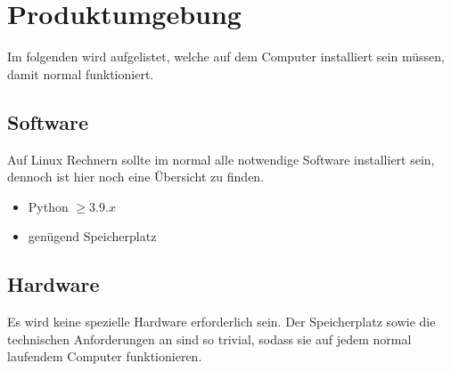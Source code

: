 \chapter{Produktumgebung}
Im folgenden wird aufgelistet, welche  auf dem Computer installiert sein müssen, damit \e normal funktioniert.\\

\section{Software}
Auf Linux Rechnern sollte im normal alle notwendige Software installiert sein, dennoch ist hier noch eine Übersicht zu finden.

\begin{itemize}
	\item Python $ \geq 3.9.x$
	\item genügend Speicherplatz 
\end{itemize}

\section{Hardware}
Es wird keine spezielle Hardware erforderlich sein. Der Speicherplatz sowie die technischen Anforderungen an \e sind so trivial, sodass sie auf jedem normal laufendem Computer funktionieren.  